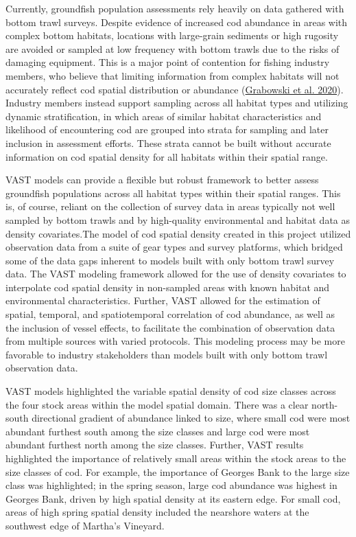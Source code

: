 \documentclass[
]{article}
\begin{document}
Currently, groundfish population assessments rely heavily on data gathered with bottom trawl surveys. Despite evidence of increased cod abundance in areas with complex bottom habitats, locations with large-grain sediments or high rugosity are avoided or sampled at low frequency with bottom trawls due to the risks of damaging equipment. This is a major point of contention for fishing industry members, who believe that limiting information from complex habitats will not accurately reflect cod spatial distribution or abundance (\protect\hyperlink{ref-grabowski_2020}{Grabowski et al. 2020}). Industry members instead support sampling across all habitat types and utilizing dynamic stratification, in which areas of similar habitat characteristics and likelihood of encountering cod are grouped into strata for sampling and later inclusion in assessment efforts. These strata cannot be built without accurate information on cod spatial density for all habitats within their spatial range.

VAST models can provide a flexible but robust framework to better assess groundfish populations across all habitat types within their spatial ranges. This is, of course, reliant on the collection of survey data in areas typically not well sampled by bottom trawls and by high-quality environmental and habitat data as density covariates.The model of cod spatial density created in this project utilized observation data from a suite of gear types and survey platforms, which bridged some of the data gaps inherent to models built with only bottom trawl survey data. The VAST modeling framework allowed for the use of density covariates to interpolate cod spatial density in non-sampled areas with known habitat and environmental characteristics. Further, VAST allowed for the estimation of spatial, temporal, and spatiotemporal correlation of cod abundance, as well as the inclusion of vessel effects, to facilitate the combination of observation data from multiple sources with varied protocols. This modeling process may be more favorable to industry stakeholders than models built with only bottom trawl observation data.

VAST models highlighted the variable spatial density of cod size classes across the four stock areas within the model spatial domain. There was a clear north-south directional gradient of abundance linked to size, where small cod were most abundant furthest south among the size classes and large cod were most abundant furthest north among the size classes. Further, VAST results highlighted the importance of relatively small areas within the stock areas to the size classes of cod. For example, the importance of Georges Bank to the large size class was highlighted; in the spring season, large cod abundance was highest in Georges Bank, driven by high spatial density at its eastern edge. For small cod, areas of high spring spatial density included the nearshore waters at the southwest edge of Martha's Vineyard.
\end{document}
